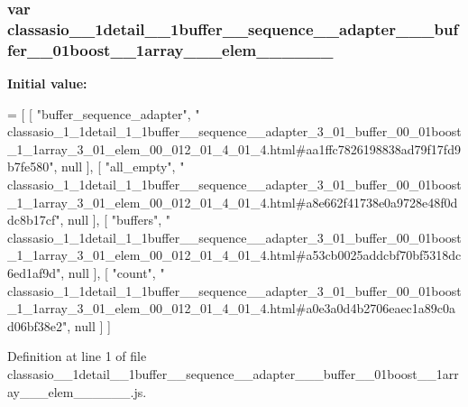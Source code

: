 \subsubsection[{classasio\+\_\+1\+\_\+1detail\+\_\+1\+\_\+1buffer\+\_\+\+\_\+sequence\+\_\+\+\_\+adapter\+\_\+3\+\_\+01\+\_\+buffer\+\_\+00\+\_\+01boost\+\_\+1\+\_\+1array\+\_\+3\+\_\+01\+\_\+elem\+\_\+00\+\_\+012\+\_\+01\+\_\+4\+\_\+01\+\_\+4}]{\setlength{\rightskip}{0pt plus 5cm}var classasio\+\_\+\_\+1detail\+\_\+\_\+1buffer\+\_\+\+\_\+sequence\+\_\+\+\_\+adapter\+\_\+\_\+\_\+buffer\+\_\+\_\+01boost\+\_\+\_\+1array\+\_\+\_\+\_\+elem\+\_\+\_\+\_\+\_\+\_\+\_}\label{classasio__1__1detail__1__1buffer____sequence____adapter__3__01__buffer__00__01boost__1__1array_ec69ddb98f2aeb88bdfaf1b393a46f45_a0df56a901d79f37ac525b8e6cd068f6c}
{\bfseries Initial value\+:}
\begin{DoxyCode}
=
[
    [ \textcolor{stringliteral}{"buffer\_sequence\_adapter"}, \textcolor{stringliteral}{"
      classasio\_1\_1detail\_1\_1buffer\_\_sequence\_\_adapter\_3\_01\_buffer\_00\_01boost\_1\_1array\_3\_01\_elem\_00\_012\_01\_4\_01\_4.html#aa1ffc7826198838ad79f17fd9b7fe580"}, null ],
    [ \textcolor{stringliteral}{"all\_empty"}, \textcolor{stringliteral}{"
      classasio\_1\_1detail\_1\_1buffer\_\_sequence\_\_adapter\_3\_01\_buffer\_00\_01boost\_1\_1array\_3\_01\_elem\_00\_012\_01\_4\_01\_4.html#a8e662f41738e0a9728e48f0ddc8b17cf"}, null ],
    [ \textcolor{stringliteral}{"buffers"}, \textcolor{stringliteral}{"
      classasio\_1\_1detail\_1\_1buffer\_\_sequence\_\_adapter\_3\_01\_buffer\_00\_01boost\_1\_1array\_3\_01\_elem\_00\_012\_01\_4\_01\_4.html#a53cb0025addcbf70bf5318dc6ed1af9d"}, null ],
    [ \textcolor{stringliteral}{"count"}, \textcolor{stringliteral}{"
      classasio\_1\_1detail\_1\_1buffer\_\_sequence\_\_adapter\_3\_01\_buffer\_00\_01boost\_1\_1array\_3\_01\_elem\_00\_012\_01\_4\_01\_4.html#a0e3a0d4b2706eaec1a89c0ad06bf38e2"}, null ]
]
\end{DoxyCode}


Definition at line 1 of file classasio\+\_\+\_\+1detail\+\_\+\_\+1buffer\+\_\+\+\_\+sequence\+\_\+\+\_\+adapter\+\_\+\_\+\_\+buffer\+\_\+\_\+01boost\+\_\+\_\+1array\+\_\+\_\+\_\+elem\+\_\+\_\+\_\+\_\+\_\+\_.\+js.

